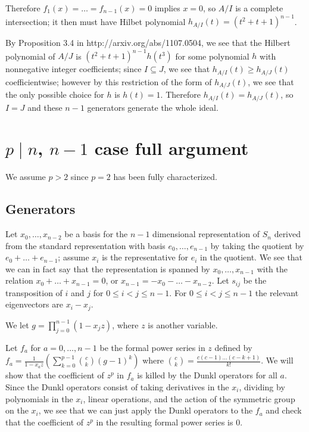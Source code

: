 \documentclass{article}
\numberwithin{equation}{section}
\begin{document}
Therefore $f_1(x) = \dots = f_{n-1}(x)=0$ implies $x=0$, so $A/I$ is a complete intersection; it then must have Hilbet polynomial $h_{A/I}(t)=(t^2+t+1)^{n-1}$. 

By Proposition 3.4 in http://arxiv.org/abs/1107.0504, we see that the Hilbert polynomial of $A/J$ is $(t^2+t+1)^{n-1}h(t^3)$ for some polynomial $h$ with nonnegative integer coefficients; since $I \subseteq J$, we see that $h_{A/I}(t) \ge h_{A/J}(t)$ coefficientwise; however by this restriction of the form of $h_{A/J}(t)$, we see that the only possible choice for $h$ is $h(t)=1$. Therefore $h_{A/I}(t)=h_{A/J}(t)$, so $I=J$ and these $n-1$ generators generate the whole ideal.


\section{$p \mid n$, $n-1$ case full argument}

We assume $p > 2$ since $p=2$ has been fully characterized. 

\subsection{Generators}

Let $x_0,\dots,x_{n-2}$ be a basis for the $n-1$ dimensional representation of $S_n$ derived from the standard representation with basis $e_0,\dots,e_{n-1}$ by taking the quotient by $e_0+\dots+e_{n-1}$; assume $x_i$ is the representative for $e_i$ in the quotient. We see that we can in fact say that the representation is spanned by $x_0,\dots,x_{n-1}$ with the relation $x_0+\dots+x_{n-1}=0$, or $x_{n-1}=-x_0-\dots-x_{n-2}$. Let $s_{ij}$ be the transposition of $i$ and $j$ for $0 \le i < j \le n-1$. For $0 \le i < j \le n-1$ the relevant eigenvectors are $x_i-x_j$.

We let $g=\prod_{j=0}^{n-1} (1-x_jz)$, where $z$ is another variable.

Let $f_a$ for $a=0,\dots,n-1$ be the formal power series in $z$ defined by $f_a=\frac{1}{1-x_az}\left(\sum_{k=0}^{p-1} \binom{c}{k} (g-1)^k\right)$ where $\binom{c}{k}=\frac{c(c-1)\dots(c-k+1)}{k!}$. We will show that the coefficient of $z^p$ in $f_a$ is killed by the Dunkl operators for all $a$. Since the Dunkl operators consist of taking derivatives in the $x_i$, dividing by polynomials in the $x_i$, linear operations, and the action of the symmetric group on the $x_i$, we see that we can just apply the Dunkl operators to the $f_a$ and check that the coefficient of $z^p$ in the resulting formal power series is $0$. 
\end{document}
